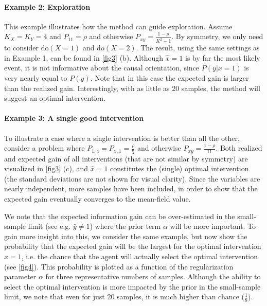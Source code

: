 \documentclass[letterpaper]{article} %
\newcommand{\doo}{\textrm{do}}
\begin{document}
\paragraph{Example 2: Exploration}
This example illustrates how the method can guide exploration. Assume $K_X = K_Y = 4$ and $P_{11} = \rho$ and otherwise $P_{xy} = \frac{1-\rho}{ K^2-1}$. By symmetry, we only need to consider $\doo(X=1)$ and $\doo(X=2)$. The result, using the same settings as in Example 1, can be found in \cref{fig3} (b). Although $\hat x =1$ is by far the most likely event, it is not informative about the causal orientation, since $P(y|x=1)$ is very nearly equal to $P(y)$. Note that in this case the expected gain is larger than the realized gain. Interestingly, with as little as 20 samples, the method will suggest an optimal intervention. 


\paragraph{Example 3: A single good intervention}
To illustrate a case where a single intervention is better than all the other, consider a problem where $P_{1,4} = P_{x,1} = \frac{\rho}{5}$ and otherwise $P_{xy} = \frac{1-\rho}{11}$. Both realized and expected gain of all interventions (that are not similar by symmetry) are visualized in \cref{fig3} (c), and $\hat x = 1$ constitutes the (single) optimal intervention (the standard deviations are not shown for visual clarity). %
 Since the variables are nearly independent, more samples have been included, in order to show that the expected  gain eventually converges to the mean-field value. 


We note that the expected information gain can be over-estimated in the small-sample limit (see e.g. $\hat y \neq 1$) where the prior term $\alpha$ will be more important.
 To gain more insight into this, we consider the same example, but now show the probability that the expected gain will be the largest for the optimal intervention $\hat x=1$, i.e. the chance that the agent will actually select the optimal intervention (see  \cref{fig4}). This probability is plotted as a function of the regularization parameter $\alpha$ for three representative numbers of samples. Although the ability to select the optimal intervention is more impacted by the prior in the small-sample limit, we note that even for just 20 samples, it is much higher than chance ($\frac{1}{8}$). 
\end{document}
